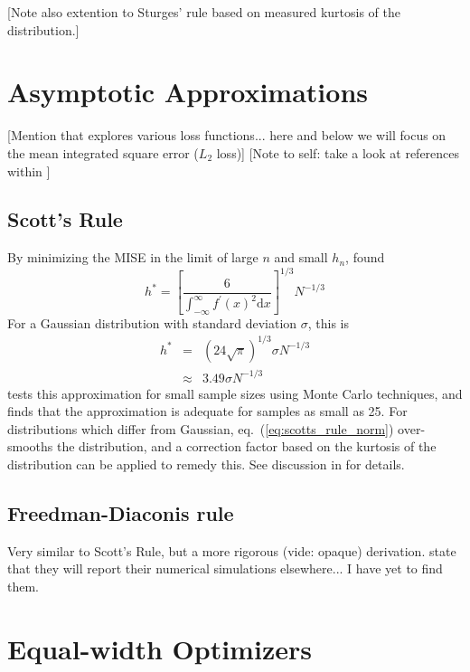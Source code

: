 \documentclass[12pt]{article}
\newcommand{\comment}[1]{{\color{green} [#1]}}
\newcommand{\dd}{\mathrm{d}}
\newcommand{\eqn}[1]{eq.~(\ref{eq:#1})}
\begin{document}
\comment{Note also \citet{Doane1976} extention to Sturges' rule based on
  measured kurtosis of the distribution.}

\section{Asymptotic Approximations}
\label{sec:asymptotic_approx}
\comment{Mention that \citet{Birge2003} explores various loss functions...
  here and below we will focus on the mean integrated square error ($L_2$ loss)}
\comment{Note to self: take a look at references within \citet{Birge2003}}

\subsection{Scott's Rule}
By minimizing the MISE in the limit of large $n$ and small $h_n$, 
\citep{Scott1979} found
\begin{equation}
  \label{eq:scotts_rule}
  h^\ast = \left[\frac{6}{\int_{-\infty}^\infty f^\prime(x)^2 \dd x}\right]^{1/3}
  N^{-1/3}
\end{equation}
For a Gaussian distribution with standard deviation $\sigma$, this is 
\begin{eqnarray}
  \label{eq:scotts_rule_norm}
  h^\ast &=& (24\sqrt{\pi})^{1/3}\sigma N^{-1/3}\\
        &\approx& 3.49 \sigma N^{-1/3}
\end{eqnarray}
\citet{Scott1979} tests this approximation for small sample sizes using Monte
Carlo techniques, and finds that the approximation is adequate for samples
as small as 25.  For distributions which differ from Gaussian,
\eqn{scotts_rule_norm} over-smooths the distribution, and a correction factor
based on the kurtosis of the distribution can be applied to remedy this.  See
discussion in \citet{Scott1979} for details.


\subsection{Freedman-Diaconis rule}
\citep{Freedman1981}
Very similar to Scott's Rule, but a more rigorous (vide: opaque) derivation.
\citet{Freedman1981} state that they will report their numerical simulations
elsewhere... I have yet to find them.

\section{Equal-width Optimizers}
\label{sec:equal_width}
\end{document}

